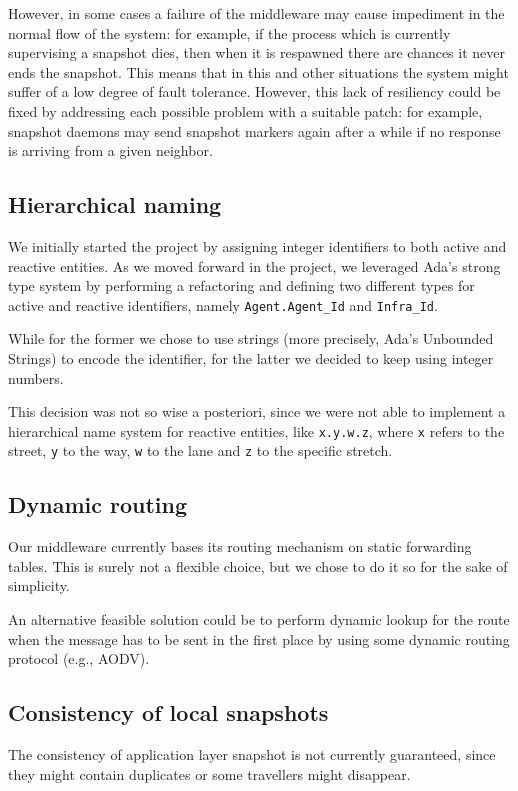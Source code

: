 However, in some cases a failure of the middleware may cause impediment in the
normal flow of the system: for example, if the process which is currently
supervising a snapshot dies, then when it is respawned there are chances it
never ends the snapshot.
This means that in this and other situations the system might suffer of a low
degree of fault tolerance. However, this lack of resiliency could be fixed by
addressing each possible problem with a suitable patch: for example, snapshot
daemons may send snapshot markers again after a while if no response is
arriving from a given neighbor.

\subsection{Hierarchical naming}
We initially started the project by assigning integer identifiers to both
active and reactive entities. As we moved forward in the project, we leveraged
Ada's strong type system by performing a refactoring and defining two different
types for active and reactive identifiers, namely \texttt{Agent.Agent\_Id} and
\texttt{Infra\_Id}.

While for the former we chose to use strings (more precisely, Ada's Unbounded
Strings) to encode the identifier, for the latter we decided to keep using
integer numbers.

This decision was not so wise a posteriori, since we were not able to implement
a hierarchical name system for reactive entities, like \texttt{x.y.w.z}, where
\texttt{x} refers to the street, \texttt{y} to the way, \texttt{w} to the lane
and \texttt{z} to the specific stretch.

\subsection{Dynamic routing}
Our middleware currently bases its routing mechanism on static forwarding
tables. This is surely not a flexible choice, but we chose to do it so for the
sake of simplicity.

An alternative feasible solution could be to perform dynamic lookup for the
route when the message has to be sent in the first place by using some dynamic
routing protocol (e.g., AODV).

\subsection{Consistency of local snapshots}
The consistency of application layer snapshot is not currently guaranteed,
since they might contain duplicates or some travellers might disappear.

